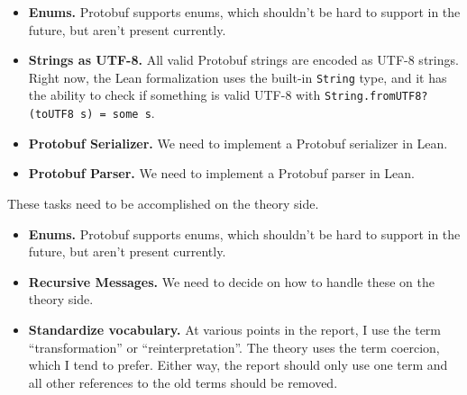\begin{itemize}
\item \textbf{Enums.} Protobuf supports enums, which shouldn't be hard to
  support in the future, but aren't present currently.

\item \textbf{Strings as UTF-8.} All valid Protobuf strings are encoded as UTF-8
  strings. Right now, the Lean formalization uses the built-in \texttt{String}
  type, and it has the ability to check if something is valid UTF-8 with
  \texttt{String.fromUTF8? (toUTF8 s) = some s}.

\item \textbf{Protobuf Serializer.} We need to implement a Protobuf serializer
  in Lean.

\item \textbf{Protobuf Parser.} We need to implement a Protobuf parser in Lean.

\end{itemize}

These tasks need to be accomplished on the theory side.

\begin{itemize}
\item \textbf{Enums.} Protobuf supports enums, which shouldn't be hard to
  support in the future, but aren't present currently.

\item \textbf{Recursive Messages.} We need to decide on how to handle these on
  the theory side.

\item \textbf{Standardize vocabulary.} At various points in the report, I use
  the term ``transformation'' or ``reinterpretation''. The theory uses the term
  coercion, which I tend to prefer. Either way, the report should only use one
  term and all other references to the old terms should be removed.
\end{itemize}

